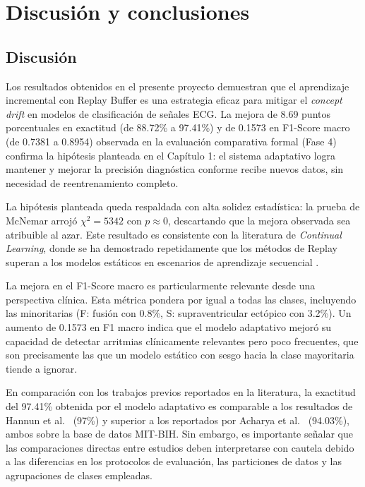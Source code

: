 
 

\chapter{Discusión y conclusiones}

\section{Discusión}

Los resultados obtenidos en el presente proyecto demuestran que el aprendizaje incremental con Replay Buffer es una estrategia eficaz para mitigar el \textit{concept drift} en modelos de clasificación de señales ECG. La mejora de 8.69 puntos porcentuales en exactitud (de 88.72\% a 97.41\%) y de 0.1573 en F1-Score macro (de 0.7381 a 0.8954) observada en la evaluación comparativa formal (Fase 4) confirma la hipótesis planteada en el Capítulo 1: el sistema adaptativo logra mantener y mejorar la precisión diagnóstica conforme recibe nuevos datos, sin necesidad de reentrenamiento completo.

La hipótesis planteada queda respaldada con alta solidez estadística: la prueba de McNemar arrojó $\chi^2 = 5342$ con $p \approx 0$, descartando que la mejora observada sea atribuible al azar. Este resultado es consistente con la literatura de \textit{Continual Learning}, donde se ha demostrado repetidamente que los métodos de Replay superan a los modelos estáticos en escenarios de aprendizaje secuencial \cite{Reshad2025}.

La mejora en el F1-Score macro es particularmente relevante desde una perspectiva clínica. Esta métrica pondera por igual a todas las clases, incluyendo las minoritarias (F: fusión con 0.8\%, S: supraventricular ectópico con 3.2\%). Un aumento de 0.1573 en F1 macro indica que el modelo adaptativo mejoró su capacidad de detectar arritmias clínicamente relevantes pero poco frecuentes, que son precisamente las que un modelo estático con sesgo hacia la clase mayoritaria tiende a ignorar.

En comparación con los trabajos previos reportados en la literatura, la exactitud del 97.41\% obtenida por el modelo adaptativo es comparable a los resultados de Hannun et al.\ \cite{Hannun2019} (97\%) y superior a los reportados por Acharya et al.\ \cite{Acharya2017} (94.03\%), ambos sobre la base de datos MIT-BIH. Sin embargo, es importante señalar que las comparaciones directas entre estudios deben interpretarse con cautela debido a las diferencias en los protocolos de evaluación, las particiones de datos y las agrupaciones de clases empleadas.


